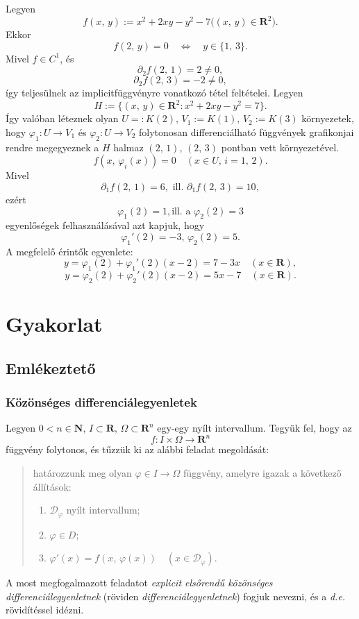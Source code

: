 \documentclass{article}
\newcommand{\R}{\mathbf{R}}
\newcommand{\N}{\mathbf{N}}
\begin{document}
	Legyen
	\[
		f(x, \, y) := x^2 + 2xy - y^2 - 7 \big( (x, \, y) \in \R^2 \big).
	\]
	Ekkor
	\[
		f(2, \, y) = 0 \quad \Longleftrightarrow \quad y \in \{1, \, 3\}.
	\]
	Mivel $f \in C^1$, és
	\[
		\partial_2 f(2, \, 1) = 2 \neq 0,
	\]
	\[
		\partial_2 f(2, \, 3) = -2 \neq 0,
	\]
	így teljesülnek az implicitfüggvényre vonatkozó tétel feltételei. Legyen
	\[
		H := \{ (x, \, y) \in \R^2 : x^2 + 2xy - y^2 = 7 \}.
	\]
	Így valóban léteznek olyan $U =: K(2), \, V_1 := K(1), \, V_2 := K(3)$ környezetek, hogy $\varphi_1 : U \to V_1$ és $\varphi_2 : U \to V_2$ folytonosan differenciálható függvények grafikonjai rendre megegyeznek a $H$ halmaz $(2, \, 1), \, (2, \, 3)$ pontban vett környezetével.
	\[
		f(x, \, \varphi_i(x)) = 0 \quad (x \in U, \, i = 1, \, 2).
	\]
	Mivel
	\[
		\partial_1 f(2, \, 1) = 6, \text{ ill. } \partial_1f(2, \, 3) = 10,
	\]
	ezért
	\[
		\varphi_1(2) = 1, \text{ill. a } \varphi_2(2) = 3
	\]
	egyenlőségek felhasználásával azt kapjuk, hogy
	\[
		\varphi_1'(2) = -3, \, \varphi_2(2) = 5.
	\]
	A megfelelő érintők egyenlete:
	\[
		y = \varphi_1(2) + \varphi_1'(2)(x-2) = 7-3x \quad (x \in \R),
	\]
	\[
		y = \varphi_2(2) + \varphi_2'(2)(x-2) = 5x-7 \quad (x \in \R).
	\]
	
	\newpage
	\section{Gyakorlat}
	\subsection{Emlékeztető}
	\subsubsection{Közönséges differenciálegyenletek}
	
	Legyen $0 < n \in \N, \, I \subset \R, \, \Omega \subset \R^n$ egy-egy nyílt intervallum. Tegyük fel, hogy az
	\[
		f : I \times \Omega \to \R^n
	\]
	függvény folytonos, és tűzzük ki az alábbi feladat megoldását:
	\begin{quote}
		határozzunk meg olyan $\varphi \in I \to \Omega$ függvény, amelyre igazak a következő állítások:
		\begin{enumerate}
			\item $\mathcal{D}_\varphi$ nyílt intervallum;
			\item $\varphi \in D$;
			\item $\varphi'(x) = f(x, \, \varphi(x)) \quad (x \in \mathcal{D}_\varphi)$.
		\end{enumerate}
	\end{quote}
	A most megfogalmazott feladatot \textit{explicit elsőrendű közönséges differenciálegyenletnek} (röviden \textit{differenciálegyenletnek}) fogjuk nevezni, és a \textit{d.e.} rövidítéssel idézni.\\
	
\end{document}
